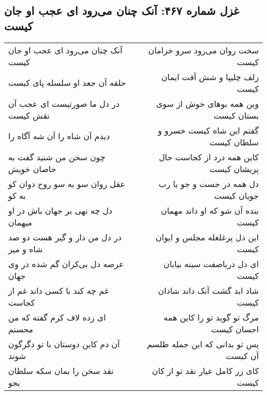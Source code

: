 \begin{center}
\section*{غزل شماره ۴۶۷: آنک چنان می‌رود ای عجب او جان کیست}
\label{sec:0467}
\begin{longtable}{l p{0.5cm} r}
آنک چنان می‌رود ای عجب او جان کیست
&&
سخت روان می‌رود سرو خرامان کیست
\\
حلقه آن جعد او سلسله پای کیست
&&
زلف چلیپا و شش آفت ایمان کیست
\\
در دل ما صورتیست ای عجب آن نقش کیست
&&
وین همه بوهای خوش از سوی بستان کیست
\\
دیدم آن شاه را آن شه آگاه را
&&
گفتم این شاه کیست خسرو و سلطان کیست
\\
چون سخن من شنید گفت به خاصان خویش
&&
کاین همه درد از کجاست حال پریشان کیست
\\
عقل روان سو به سو روح دوان کو به کو
&&
دل همه در جست و جو یا رب جویان کیست
\\
دل چه نهی بر جهان باش در او میهمان
&&
بنده آن شو که او داند مهمان کیست
\\
در دل من دار و گیر هست دو صد شاه و میر
&&
این دل پرغلغله مجلس و ایوان کیست
\\
عرصه دل بی‌کران گم شده در وی جهان
&&
ای دل دریاصفت سینه بیابان کیست
\\
غم چه کند با کسی داند غم از کجاست
&&
شاد ابد گشت آنک داند شادان کیست
\\
ای زده لاف کرم گفته که من محسنم
&&
مرگ تو گوید تو را کاین همه احسان کیست
\\
آن دم کاین دوستان با تو دگرگون شوند
&&
پس تو بدانی که این جمله طلسم آن کیست
\\
نقد سخن را بمان سکه سلطان بجو
&&
کای زر کامل عیار نقد تو از کان کیست
\\
\end{longtable}
\end{center}
